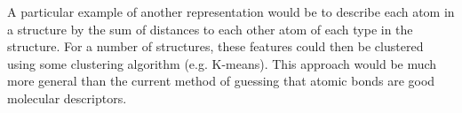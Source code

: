 A particular example of another representation would be to describe each atom in a structure by the sum of distances to each other atom of each type in the structure. For a number of structures, these features could then be clustered using some clustering algorithm (e.g. K-means). This approach would be much more general than the current method of guessing that atomic bonds are good molecular descriptors.\\




 
